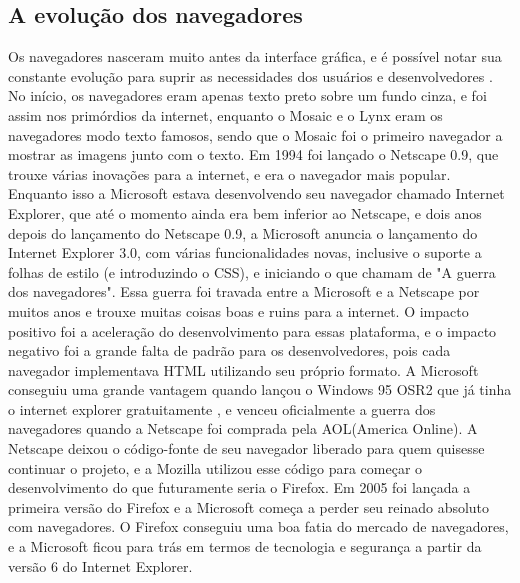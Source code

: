 \subsection{A evolução dos navegadores}

Os navegadores nasceram muito antes da interface gráfica,
e é possível notar sua constante evolução para suprir as necessidades
dos usuários e desenvolvedores \cite{robbins2006web}. No início, os
navegadores eram apenas texto preto sobre um fundo cinza, e foi assim
nos primórdios da internet, enquanto o Mosaic e o Lynx eram os
navegadores modo texto famosos, sendo que o Mosaic foi o primeiro
navegador a mostrar as imagens junto com o texto.
Em 1994 foi lançado o Netscape 0.9, que
trouxe várias inovações para a internet, e era o navegador mais
popular. Enquanto isso a Microsoft estava desenvolvendo seu navegador
chamado Internet Explorer, que até o momento ainda era bem inferior ao
Netscape, e dois anos depois do lançamento do
Netscape 0.9, a Microsoft anuncia o lançamento do Internet Explorer 3.0, com várias
funcionalidades novas, inclusive o suporte a folhas de estilo (e
introduzindo o CSS), e iniciando o que chamam de "A guerra dos
navegadores". Essa guerra foi travada entre a Microsoft e a Netscape
por muitos anos e trouxe muitas coisas boas e ruins para a internet. O
impacto positivo foi a aceleração do desenvolvimento para essas
plataforma, e o impacto negativo foi a grande falta de padrão para os
desenvolvedores, pois cada navegador implementava HTML utilizando seu
próprio formato. A Microsoft conseguiu uma grande vantagem quando lançou
o Windows 95 OSR2 que já tinha o internet explorer gratuitamente
\cite{asleson2006foundations}, e venceu oficialmente a guerra dos navegadores quando a
Netscape foi comprada pela AOL(America Online). A Netscape deixou o código-fonte
de seu navegador liberado para quem quisesse continuar o projeto,
e a Mozilla utilizou esse código para começar o desenvolvimento
do que futuramente seria o Firefox.
Em 2005 foi lançada a primeira versão do Firefox e a Microsoft começa
a perder seu reinado absoluto com navegadores. O Firefox conseguiu uma
boa fatia do mercado de navegadores, e a Microsoft ficou para trás em
termos de tecnologia e segurança a partir da versão 6 do Internet Explorer.

